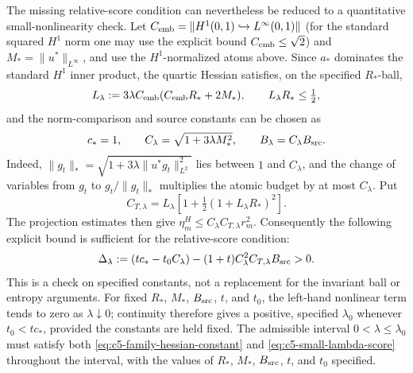 \documentclass[11pt]{article}
\theoremstyle{remark}
\begin{document}
The missing relative-score condition can nevertheless be reduced to a
quantitative small-nonlinearity check.  Let
$C_{\rm emb}=\|H^1(0,1)\hookrightarrow L^\infty(0,1)\|$ (for the
standard squared $H^1$ norm one may use the explicit bound
$C_{\rm emb}\leq\sqrt2$) and
$M_* = \|u^*\|_{L^\infty}$, and use the $H^1$-normalized atoms above.
Since $a_*$ dominates the standard $H^1$ inner product, the quartic
Hessian satisfies, on the specified $R_*$-ball,
\begin{equation}
 L_\lambda:=3\lambda C_{\rm emb}
       (C_{\rm emb}R_*+2M_*),\qquad L_\lambda R_*\leq\tfrac12,
 \label{eq:c5-family-hessian-constant}
\end{equation}
and the norm-comparison and source constants can be chosen as
\begin{equation}
 c_*=1,\qquad C_\lambda=\sqrt{1+3\lambda M_*^2},\qquad
 B_\lambda=C_\lambda B_{\rm src}.
 \label{eq:c5-family-bridge-constants}
\end{equation}
Indeed, $\|g_t\|_*=\sqrt{1+3\lambda\|u^*g_t\|_{L^2}^2}$ lies
between $1$ and $C_\lambda$, and the change of variables from $g_t$ to
$g_t/\|g_t\|_*$ multiplies the atomic budget by at most $C_\lambda$.
Put
\begin{equation}
 C_{T,\lambda}=L_\lambda\left[1+\tfrac12(1+L_\lambda R_*)^2\right].
 \label{eq:c5-family-transfer-constant}
\end{equation}
The projection estimates then give
$\eta_m^H\leq C_\lambda C_{T,\lambda}r_m^2$.  Consequently the
following explicit bound is sufficient for the relative-score condition:
\begin{equation}
 \Delta_\lambda:=(tc_*-t_0C_\lambda)
 -(1+t)C_\lambda^2C_{T,\lambda}B_{\rm src}>0.
 \label{eq:c5-small-lambda-score}
\end{equation}
This is a check on specified constants, not a replacement for the invariant
ball or entropy arguments.  For fixed $R_*$, $M_*$, $B_{\rm src}$, $t$, and
$t_0$, the left-hand nonlinear term tends to zero as $\lambda\downarrow0$;
continuity therefore gives a positive, specified $\lambda_0$ whenever
$t_0<tc_*$, provided the constants are held fixed. The admissible interval
$0<\lambda\leq\lambda_0$ must satisfy both
\eqref{eq:c5-family-hessian-constant} and \eqref{eq:c5-small-lambda-score}
throughout the interval, with the values of $R_*$, $M_*$, $B_{\rm src}$,
$t$, and $t_0$ specified.
\end{document}
